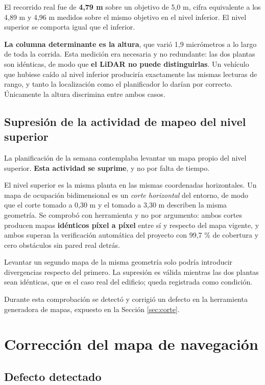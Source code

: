\documentclass[12pt,letterpaper]{article}
\begin{document}
El recorrido real fue de \textbf{4,79 m} sobre un objetivo de 5,0 m, cifra equivalente a los 4,89 m y 4,96 m medidos sobre el mismo objetivo en el nivel inferior. El nivel superior se comporta igual que el inferior.

\textbf{La columna determinante es la altura}, que varió 1,9 micrómetros a lo largo de toda la corrida. Esta medición era necesaria y no redundante: las dos plantas son idénticas, de modo que \textbf{el LiDAR no puede distinguirlas}. Un vehículo que hubiese caído al nivel inferior produciría exactamente las mismas lecturas de rango, y tanto la localización como el planificador lo darían por correcto. Únicamente la altura discrimina entre ambos casos.

\subsection{Supresión de la actividad de mapeo del nivel superior}

La planificación de la semana contemplaba levantar un mapa propio del nivel superior. \textbf{Esta actividad se suprime}, y no por falta de tiempo.

El nivel superior es la misma planta en las mismas coordenadas horizontales. Un mapa de ocupación bidimensional es un \emph{corte horizontal} del entorno, de modo que el corte tomado a 0,30 m y el tomado a 3,30 m describen la misma geometría. Se comprobó con herramienta y no por argumento: ambos cortes producen mapas \textbf{idénticos píxel a píxel} entre sí y respecto del mapa vigente, y ambos superan la verificación automática del proyecto con 99,7 \% de cobertura y cero obstáculos sin pared real detrás.

Levantar un segundo mapa de la misma geometría solo podría introducir divergencias respecto del primero. La supresión es válida mientras las dos plantas sean idénticas, que es el caso real del edificio; queda registrada como condición.

Durante esta comprobación se detectó y corrigió un defecto en la herramienta generadora de mapas, expuesto en la Sección \ref{sec:corte}.

\section{Corrección del mapa de navegación}
\label{sec:mapa}

\subsection{Defecto detectado}
\end{document}
